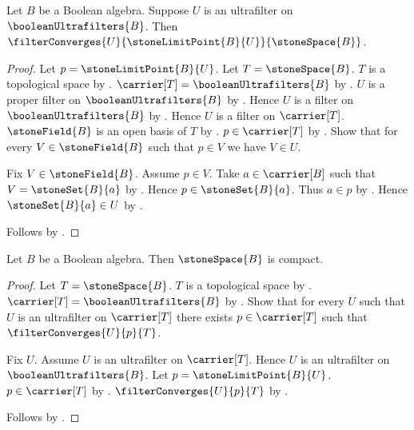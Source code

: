 \begin{theorem}\label{stone_limit_point_convergence}
    Let $B$ be a Boolean algebra.
    Suppose $U$ is an ultrafilter on
        $\booleanUltrafilters{B}$.
    Then $\filterConverges
        {U}{\stoneLimitPoint{B}{U}}{\stoneSpace{B}}$.
\end{theorem}
\begin{proof}
    Let $p=\stoneLimitPoint{B}{U}$.
    Let $T=\stoneSpace{B}$.
    $T$ is a topological space by
        .
    $\carrier[T]=\booleanUltrafilters{B}$ by
        .
    $U$ is a proper filter on $\booleanUltrafilters{B}$ by
        .
    Hence $U$ is a filter on $\booleanUltrafilters{B}$ by
        .
    Hence $U$ is a filter on $\carrier[T]$.
    $\stoneField{B}$ is an open basis of $T$ by
        .
    $p\in\carrier[T]$ by
        .
    Show that for every $V\in\stoneField{B}$ such that $p\in V$
        we have $V\in U$.
    \begin{subproof}
        Fix $V\in\stoneField{B}$.
        Assume $p\in V$.
        Take $a\in\carrier[B]$ such that
            $V=\stoneSet{B}{a}$ by .
        Hence $p\in\stoneSet{B}{a}$.
        Thus $a\in p$ by .
        Hence $\stoneSet{B}{a}\in U$ by
            .
    \end{subproof}
    Follows by
        .
\end{proof}

\begin{theorem}\label{stone_space_is_compact}
    Let $B$ be a Boolean algebra.
    Then $\stoneSpace{B}$ is compact.
\end{theorem}
\begin{proof}
    Let $T=\stoneSpace{B}$.
    $T$ is a topological space by
        .
    $\carrier[T]=\booleanUltrafilters{B}$ by
        .
    Show that for every $U$ such that $U$ is an ultrafilter on
        $\carrier[T]$ there exists $p\in\carrier[T]$ such that
            $\filterConverges{U}{p}{T}$.
    \begin{subproof}
        Fix $U$.
        Assume $U$ is an ultrafilter on $\carrier[T]$.
        Hence $U$ is an ultrafilter on $\booleanUltrafilters{B}$.
        Let $p=\stoneLimitPoint{B}{U}$.
        $p\in\carrier[T]$ by
            .
        $\filterConverges{U}{p}{T}$ by
            .
    \end{subproof}
    Follows by .
\end{proof}

